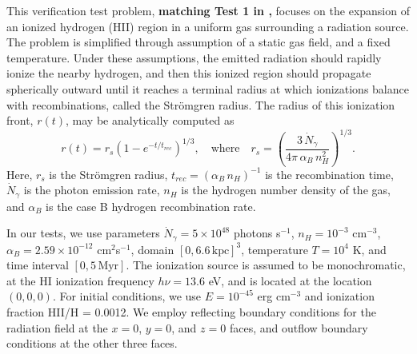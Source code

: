 This verification test problem, {\bf matching Test 1 in
\cite{IlievEtAl2006},} focuses on the expansion of an ionized 
hydrogen (HII) region in a uniform gas surrounding a radiation
source.  The problem is simplified through assumption of a static gas
field, and a fixed temperature.  Under these assumptions, the
emitted radiation should rapidly ionize the nearby hydrogen, and then
this ionized region should propagate spherically outward until it
reaches a terminal radius at which ionizations balance with
recombinations, called the Str{\" o}mgren radius.  The radius of
this ionization front, $r(t)$, may be analytically computed as
\begin{equation}
  \label{Iliev1_solution}
  r(t) = r_s \left(1-e^{-t/t_{rec}}\right)^{1/3}, \quad\mbox{where}\quad
  r_s = \left(\frac{3\,\dot{N}_{\gamma}}{4\pi\,\alpha_B\,n_H^2}\right)^{1/3}.
\end{equation}
Here, $r_s$ is the Str{\" o}mgren radius, $t_{rec} =
(\alpha_B\,n_H)^{-1}$ is the recombination time, $\dot{N}_{\gamma}$ is
the photon emission rate, $n_H$ is the hydrogen number
density of the gas, and $\alpha_B$ is the case B hydrogen
recombination rate.

In our tests, we use parameters $\dot{N}_{\gamma} = 5\times10^{48}$
photons s$^{-1}$, $n_H = 10^{-3}$ cm$^{-3}$, $\alpha_B =
2.59\times10^{-12}$ cm$^2$s$^{-1}$, domain $[0,6.6\, \mbox{kpc}]^3$,
temperature $T=10^4$ K, and time interval $[0,5\, \mbox{Myr}]$.  The
ionization source is assumed to be monochromatic, at the HI ionization
frequency $h\nu = 13.6$ eV, and is located at the location $(0,0,0)$.
For initial conditions, we use $E = 10^{-45}$ erg cm$^{-3}$ and
ionization fraction HII/H = 0.0012.  We employ reflecting boundary
conditions for the radiation field at the $x=0$, $y=0$, and $z=0$
faces, and outflow boundary conditions at the other three faces.

